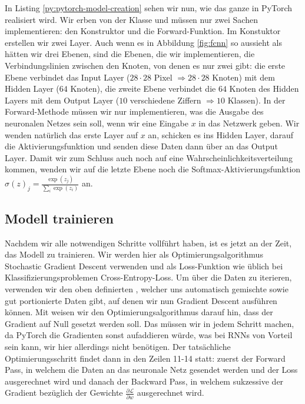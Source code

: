 
In Listing \ref{py:pytorch-model-creation} sehen wir nun, wie das ganze in PyTorch realisiert wird. 
Wir erben von der Klasse  und müssen nur zwei Sachen implementieren: 
den Konstruktor und die Forward-Funktion.
Im Konstuktor erstellen wir zwei Layer. Auch wenn es in Abbildung \ref{fig:fcnn} 
so aussieht als hätten wir drei Ebenen, sind die Ebenen, die wir implementieren, 
die Verbindungslinien zwischen den Knoten, von denen es nur zwei gibt: 
die erste Ebene verbindet das Input Layer (\(28 \cdot 28\) Pixel \(\Rightarrow 28 \cdot 28\) Knoten) 
mit dem Hidden Layer (\(64\) Knoten), die zweite Ebene verbindet die \(64\) Knoten des Hidden Layers
mit dem Output Layer (\(10\) verschiedene Ziffern \(\Rightarrow 10\) Klassen).
In der Forward-Methode müssen wir nur implementieren, was die Ausgabe des 
neuronalen Netzes sein soll, wenn wir eine Eingabe \(x\) in das Netzwerk geben. 
Wir wenden natürlich das erste Layer auf \(x\) an, schicken es ins Hidden Layer, 
darauf die Aktivierungsfunktion und senden diese Daten dann über  an das Output Layer.
Damit wir zum Schluss auch noch auf eine Wahrscheinlichkeitsverteilung kommen, 
wenden wir auf die letzte Ebene noch die Softmax-Aktivierungsfunktion \(\sigma(z)_j = \frac{\exp(z_j)}{\sum_{i} \exp(z_i)}\) an.

\subsection{Modell trainieren}
Nachdem wir alle notwendigen Schritte vollführt haben, ist es jetzt an der Zeit, das Modell zu trainieren. 
Wir werden hier als Optimierungsalgorithmus Stochastic Gradient Descent verwenden und als Loss-Funktion 
wie üblich bei Klassifizierungsproblemen Cross-Entropy-Loss. 
Um über die Daten zu iterieren, verwenden wir den oben definierten 
, welcher uns automatisch gemischte sowie gut portionierte Daten 
gibt, auf denen wir nun Gradient Descent ausführen können. 
Mit  weisen wir den Optimierungsalgorithmus darauf hin, 
dass der Gradient auf Null gesetzt werden soll. Das müssen wir in jedem Schritt machen, 
da PyTorch die Gradienten sonst aufaddieren würde, was bei RNNs von Vorteil sein kann, wir hier allerdings nicht benötigen.
Der tatsächliche Optimierungsschritt findet dann in den Zeilen 11-14 statt: 
zuerst der Forward Pass, in welchem die Daten an das neuronale 
Netz gesendet werden und der Loss ausgerechnet wird und danach der Backward Pass, 
in welchem sukzessive der Gradient bezüglich der Gewichte \(\frac{\partial \mathcal{L}}{\partial w}\)
ausgerechnet wird.

